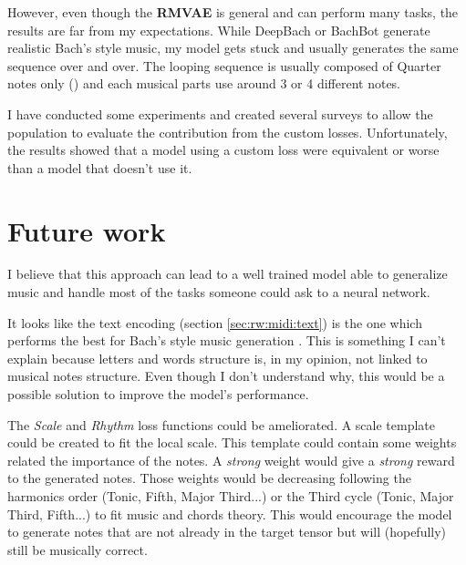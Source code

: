 \documentclass[12pt]{report}
\begin{document}
However, even though the \textbf{RMVAE} is general and can perform many tasks, the results are far from my expectations.
While DeepBach \cite{hadjeres_deepbach:_2016} or BachBot \cite{liang_automatic_2017} generate realistic Bach's style music, my model gets stuck and usually generates the same sequence over and over.
The looping sequence is usually composed of Quarter notes only (\musQuarter) and each musical parts use around 3 or 4 different notes.

I have conducted some experiments and created several surveys to allow the population to evaluate the contribution from the custom losses.
Unfortunately, the results showed that a model using a custom loss were equivalent or worse than a model that doesn't use it.


\section*{Future work}

I believe that this approach can lead to a well trained model able to generalize music and handle most of the tasks someone could ask to a neural network.

It looks like the text encoding (section \ref{sec:rw:midi:text}) is the one which performs the best for Bach's style music generation \cite{hadjeres_deepbach:_2016, liang_automatic_2017}.
This is something I can't explain because letters and words structure is, in my opinion, not linked to musical notes structure.
Even though I don't understand why, this would be a possible solution to improve the model's performance.

The \textit{Scale} and \textit{Rhythm} loss functions could be ameliorated.
A scale template could be created to fit the local scale.
This template could contain some weights related the importance of the notes.
A \textit{strong} weight would give a \textit{strong} reward to the generated notes.
Those weights would be decreasing following the harmonics order (Tonic, Fifth, Major Third...) or the Third cycle (Tonic, Major Third, Fifth...) to fit music and chords theory.
This would encourage the model to generate notes that are not already in the target tensor but will (hopefully) still be musically correct.
\end{document}
